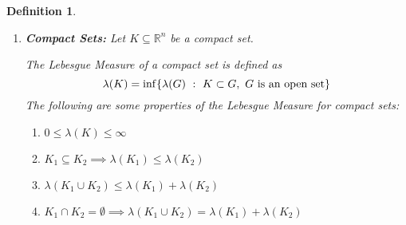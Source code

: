\documentclass[]{article}
\newcommand{\R}{\mathbb{R}}
\newcommand{\st}{\ : \ }
\newtheorem{definition}{Definition}
\begin{document}
\begin{definition}
\begin{enumerate}
        The Lebesgue Measure of an open set is defined as \[
            \lambda(G) = \sup \{
                \lambda(P) \st P \subset G, \ P \textnormal{ is a special polygon}
            \}
        \] The following are some properties of the Lebesgue Measure for open sets: \begin{enumerate}
            \item $0 \leq \lambda(G) \leq \infty$
            \item $\lambda(G) = 0 \iff G = \emptyset$
            \item $\lambda(\R^n) = \infty$
            \item $G_1 \subseteq G_2 \implies \lambda(G_1) \leq \lambda(G_2)$
            \item $\lambda\qty(\bigcup_{k=1}^{\infty} G_k) \leq \sum_{k=1}^{\infty} \lambda(G_k)$
            \item $\bigcap_{k=1}^{\infty} G_k = \emptyset \implies \lambda\qty(\bigcup_{k=1}^{\infty} G_k) = \sum_{k=1}^{\infty} \lambda(G_k)$
            \item If $P$ is a special polygon, then $\lambda(P) = \lambda(P^\circ)$
        \end{enumerate}
        \item \emph{\textbf{Compact Sets:}}
        Let $K \subseteq \R^n$ be a compact set.

        The Lebesgue Measure of a compact set is defined as \[
            \lambda(K) = \inf \{
                \lambda(G) \st K \subset G, \ G \textnormal{ is an open set}
            \}
        \] The following are some properties of the Lebesgue Measure for compact sets: \begin{enumerate}
            \item $0 \leq \lambda(K) \leq \infty$
            \item $K_1 \subseteq K_2 \implies \lambda(K_1) \leq \lambda(K_2)$
            \item $\lambda(K_1 \cup K_2) \leq \lambda(K_1) + \lambda(K_2)$
            \item $K_1 \cap K_2 = \emptyset \implies \lambda(K_1 \cup K_2) = \lambda(K_1) + \lambda(K_2)$
        \end{enumerate}
    \end{enumerate}
\end{definition}







\newpage
\end{document}

